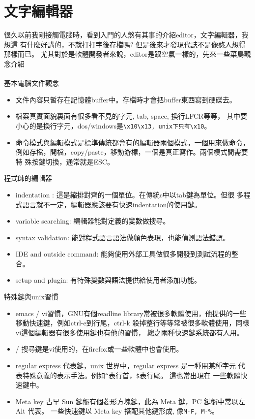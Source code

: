 \chapter{文字編輯器}
  很久以前我剛接觸電腦時，看到入門的人煞有其事的介紹editor，文字編輯器，我想這
  有什麼好講的，不就打打字後存檔嗎? 但是後來才發現代誌不是像憨人想得那樣而已。
  尤其對於是軟體開發者來說，editor是跟空氣一樣的，先來一些菜鳥觀念介紹
  \\\\
  基本電腦文件觀念
  \begin{itemize}
    \item 文件內容只暫存在記憶體buffer中。存檔時才會把buffer東西寫到硬碟去。
    \item 檔案真實面貌裏面有很多看不見的字元, tab, space, 換行LFCR等等，
      其中要小心的是換行字元，dos/windows是\verb=\x10\x13, unix下只有\x10=。
    \item 命令模式與編輯模式是標準傳統都會有的編輯器兩個模式，一個用來做命令，
      例如存檔，開檔，copy/paste，移動游標，一個是真正寫作。兩個模式間需要特
      殊按鍵切換，通常就是ESC。
  \end{itemize}
  程式師的編輯器
  \begin{itemize}
    \item indentation : 這是縮排對齊的一個單位。在傳統c中以tab鍵為單位。但很
      多程式語言就不一定，編輯器應該要有快速indentation的使用鍵。
    \item variable searching: 編輯器能對定義的變數做搜尋。
    \item syntax validation: 能對程式語言語法做顏色表現，也能偵測語法錯誤。
    \item IDE and outside command: 能夠使用外部工具做很多開發到測試流程的整合。
    \item setup and plugin: 有特殊變數與語法提供給使用者添加功能。
  \end{itemize}
  特殊鍵與unix習慣
  \begin{itemize}
    \item emacs / vi習慣，GNU有個readline
      library常被很多軟體使用，他提供的一些移動快速鍵，例如ctrl-e到行尾，ctrl-k
      殺掉整行等等常被很多軟體使用，同樣vi這個編輯器有很多使用鍵也有他的習慣，
      總之兩種快速鍵系統都有人用。
    \item / 搜尋鍵是vi使用的，在firefox或一些軟體中也會使用。
    \item regular express 代表鍵，unix 世界中，regular express 是一種用某種字元
      代表特殊意義的表示手法。例如\verb=^=表行首，\verb=$=表行尾。 這也常出現在
      一些軟體快速鍵中。
    \item Meta key 古早 Sun 鍵盤有個菱形方塊鍵，此為 Meta 鍵，PC 鍵盤中常以左Alt
      代表。 一些快速鍵以 Meta key 搭配其他鍵形成, 像\verb=M-F, M-%=。
  \end{itemize}
